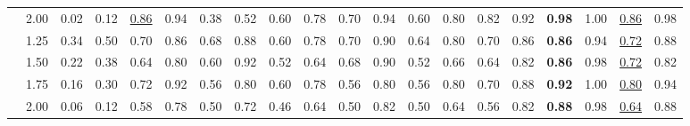 \begin{table}[ht]
{\begin{tabular}{cc|cc|cccccccccccc|cccc}
& 2.00 & 0.02 & 0.12 & \underline{0.86} & 0.94 & 0.38 & 0.52 & 0.60 & 0.78 & 0.70 & 0.94 & 0.60 & 0.80 & 0.82 & 0.92 & \textbf{0.98} & 1.00 & \underline{0.86} & 0.98 \\
\addlinespace[2pt]  %
\multirow{4}{*}{4} 
& 1.25 & 0.34 & 0.50 & 0.70 & 0.86 & 0.68 & 0.88 & 0.60 & 0.78 & 0.70 & 0.90 & 0.64 & 0.80 & 0.70 & 0.86 & \textbf{0.86} & 0.94 & \underline{0.72} & 0.88 \\
& 1.50 & 0.22 & 0.38 & 0.64 & 0.80 & 0.60 & 0.92 & 0.52 & 0.64 & 0.68 & 0.90 & 0.52 & 0.66 & 0.64 & 0.82 & \textbf{0.86} & 0.98 & \underline{0.72} & 0.82 \\
& 1.75 & 0.16 & 0.30 & 0.72 & 0.92 & 0.56 & 0.80 & 0.60 & 0.78 & 0.56 & 0.80 & 0.56 & 0.80 & 0.70 & 0.88 & \textbf{0.92} & 1.00 & \underline{0.80} & 0.94 \\
& 2.00 & 0.06 & 0.12 & 0.58 & 0.78 & 0.50 & 0.72 & 0.46 & 0.64 & 0.50 & 0.82 & 0.50 & 0.64 & 0.56 & 0.82 & \textbf{0.88} & 0.98 & \underline{0.64} & 0.88 \\
\bottomrule
\end{tabular}
}
\label{tab:gunpoint_accuracy}
\end{table}